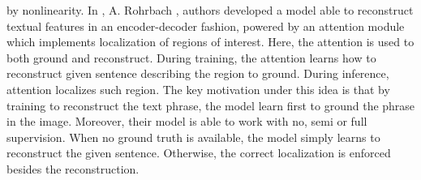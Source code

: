 by nonlinearity. In \cite{rohrbach2016grounding}, A. Rohrbach
\etal{}, authors developed a model able to reconstruct textual
features in an encoder-decoder fashion, powered by an attention module
which implements localization of regions of interest. Here, the
attention is used to both ground and reconstruct. During training, the
attention learns how to reconstruct given sentence describing the
region to ground. During inference, attention localizes such region.
The key motivation under this idea is that by training to reconstruct
the text phrase, the model learn first to ground the phrase in the
image. Moreover, their model is able to work with no, semi or full
supervision. When no ground truth is available, the model simply
learns to reconstruct the given sentence. Otherwise, the correct
localization is enforced besides the reconstruction.

